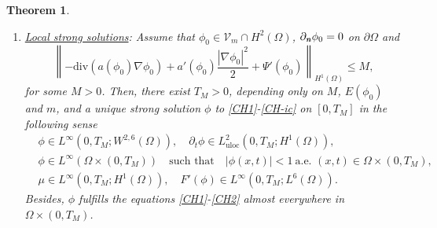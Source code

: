 \documentclass[11pt,reqno]{amsart}
\newtheorem{theorem}{Theorem}[section]
\theoremstyle{remark}
\newcommand \norm[1] {\left\Vert #1\right\Vert}
\def\n{\textbf{\textit{n}}}
\def\vphi{\varphi}
\def\div{\mathrm{div}}
\numberwithin{equation}{section}
\newcommand{\uloc}{\operatorname{uloc}}
\begin{document}
\begin{theorem}
\begin{enumerate}
\item \underline{Local strong solutions}: Assume that $\phi_0\in \mathcal{V}_m\cap H^2(\Omega)$, $\partial_\n \phi_0=0$ on $\partial \Omega$ and
\begin{equation}
\label{MM-i}
\left\| -\div \left( a(\phi_0) \nabla \phi_0 \right) + a'(\phi_0) \frac{|\nabla \phi_0|^2}{2} + \Psi'(\phi_0) \right\|_{H^1(\Omega)}\leq M,
\end{equation}
for some $M>0$. Then, there exist $T_M>0$, depending only on $M$, $E(\phi_0)$ and $m$, and a unique strong solution $\phi$ to \eqref{CH1}-\eqref{CH-ic} on $[0,T_M]$
in the following sense
\begin{equation}
\label{SS-phi-i}
\begin{split}
&\phi \in L^\infty(0,T_M; W^{2,6}(\Omega)), \quad
\partial_t \phi \in L_{\uloc}^2(0 ,T_M;H^1(\Omega)),\\
&\phi \in L^{\infty}(\Omega\times (0,T_M)) \quad\text{such that}\quad |\phi(x,t)|<1
\ \text{a.e. }(x,t)\in \Omega\times (0,T_M),\\
&\mu \in L^\infty(0,T_M; H^1(\Omega)),
\quad F'(\phi) \in L^\infty(0,T_M; L^6(\Omega)).
\end{split}
\end{equation}
Besides, $\phi$ fulfills the equations \eqref{CH1}-\eqref{CH2} almost everywhere in $\Omega \times (0,T_M)$.


\end{enumerate}
\end{theorem}
\end{document}
